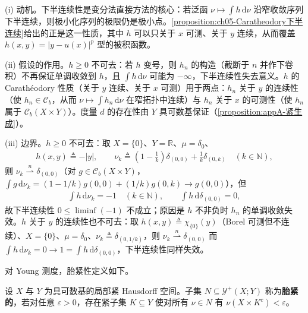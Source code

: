 \documentclass[../../main.tex]{subfiles}%
\begin{document}
\begin{remark}\label{remark:ch05-Caratheodory下半连续动机}
(i) 动机。下半连续性是变分法直接方法的核心：若泛函 $\nu\mapsto\int h\,\mathrm{d}\nu$ 沿窄收敛序列下半连续，则极小化序列的极限仍是极小点。\cref{proposition:ch05-Caratheodory下半连续}给出的正是这一性质，其中 $h$ 可以只关于 $x$ 可测、关于 $y$ 连续，从而覆盖 $h(x,y)=|y-u(x)|^p$ 型的被积函数。

(ii) 假设的作用。$h\geqslant0$ 不可去：若 $h$ 变号，则 $h_n$ 的构造（截断于 $n$ 并作下卷积）不再保证单调收敛到 $h$，且 $\int h\,\mathrm{d}\nu$ 可能为 $-\infty$，下半连续性失去意义。$h$ 的 Carathéodory 性质（关于 $y$ 连续、关于 $x$ 可测）用于两点：$h_n$ 关于 $y$ 的连续性（使 $h_n\in\mathcal{C}_b$，从而 $\nu\mapsto\int h_n\,\mathrm{d}\nu$ 在窄拓扑中连续）与 $h_n$ 关于 $x$ 的可测性（使 $h_n$ 属于 $\mathcal{C}_b(X\times Y)$）。度量 $d$ 的存在性由 $Y$ 具可数基保证（\cref{proposition:appA-紧生成}）。

(iii) 边界。$h\geqslant0$ 不可去：取 $X=\{0\}$、$Y=\mathbb{R}$、$\mu=\delta_0$、
\begin{align*}
h(x,y)\triangleq-|y|,\qquad
\nu_k\triangleq\left(1-\tfrac1k\right)\delta_{(0,0)}+\tfrac1k\delta_{(0,k)}\quad(k\in\mathbb{N}),
\end{align*}
则 $\nu_k\stackrel{n}{\rightharpoonup}\delta_{(0,0)}$（对 $g\in\mathcal{C}_b(X\times Y)$，$\int g\,\mathrm{d}\nu_k=(1-1/k)g(0,0)+(1/k)g(0,k)\to g(0,0)$），但
\begin{align*}
\int h\,\mathrm{d}\nu_k=-1\quad(k\in\mathbb{N}),
\qquad
\int h\,\mathrm{d}\delta_{(0,0)}=0,
\end{align*}
故下半连续性 $0\leqslant\liminf(-1)$ 不成立；原因是 $h$ 不非负时 $h_n$ 的单调收敛失效。$h$ 关于 $y$ 的连续性也不可去：取 $h(x,y)\triangleq\chi_{\{0\}}(y)$（Borel 可测但不连续）、$X=\{0\}$、$\mu=\delta_0$、$\nu_k\triangleq\delta_{(0,1/k)}$，则 $\nu_k\stackrel{n}{\rightharpoonup}\delta_{(0,0)}$ 而 $\int h\,\mathrm{d}\nu_k=0\to1=\int h\,\mathrm{d}\delta_{(0,0)}$，下半连续性同样失效。
\end{remark}

对 Young 测度，胎紧性定义如下。

\begin{definition}[胎紧性]\label{definition:ch05-Young胎紧}
设 $X$ 与 $Y$ 为具可数基的局部紧 Hausdorff 空间。子集 $N\subseteq\mathcal{Y}^+(X;Y)$ 称为\textbf{胎紧的}，若对任意 $\varepsilon>0$，存在紧子集 $K\subseteq Y$ 使对所有 $\nu\in N$ 有 $\nu(X\times K^c)<\varepsilon$。
\end{definition}
\end{document}
